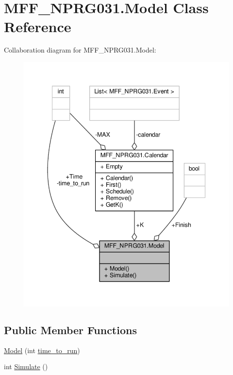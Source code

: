 \hypertarget{classMFF__NPRG031_1_1Model}{\section{M\-F\-F\-\_\-\-N\-P\-R\-G031.\-Model Class Reference}
\label{classMFF__NPRG031_1_1Model}
}


Collaboration diagram for M\-F\-F\-\_\-\-N\-P\-R\-G031.\-Model\-:\nopagebreak
\begin{figure}[H]
\begin{center}
\leavevmode
\includegraphics[width=342pt]{classMFF__NPRG031_1_1Model__coll__graph}
\end{center}
\end{figure}
\subsection*{Public Member Functions}
\begin{DoxyCompactItemize}
\item 
\hyperlink{classMFF__NPRG031_1_1Model_ada9504f66da371eebcf2c588b3da935f}{Model} (int \hyperlink{classMFF__NPRG031_1_1Model_a1e2a81337bc96f78f6336be46cdf0263}{time\-\_\-to\-\_\-run})
\item 
int \hyperlink{classMFF__NPRG031_1_1Model_a8ebc56d74c6e2c7e7481a9c413a27254}{Simulate} ()
\end{DoxyCompactItemize}
